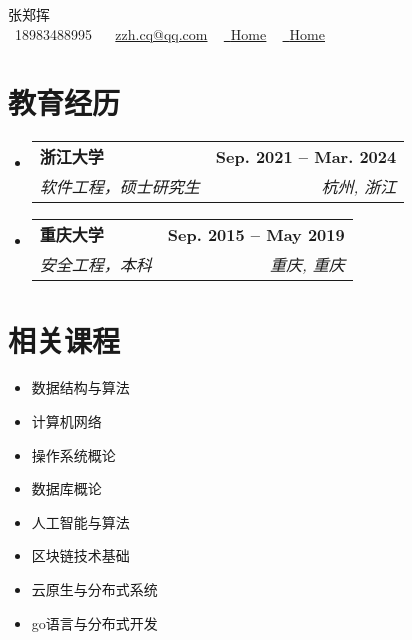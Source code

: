 \documentclass[letterpaper,11pt]{ctexart}
\makeatletter
\newcommand{\resumeSubheading}[4]{
  \vspace{-2pt}\item
    \begin{tabular*}{1.0\textwidth}[t]{l@{\extracolsep{\fill}}r}
      \textbf{#1} & \textbf{\small #2} \\
      \textit{\small#3} & \textit{\small #4} \\
    \end{tabular*}\vspace{-7pt}
}
\newcommand{\resumeSubHeadingListStart}{\begin{itemize}[leftmargin=0.0in, label={}]}
\newcommand{\resumeSubHeadingListEnd}{\end{itemize}}
\makeatother
\begin{document}

\begin{center}
    {\Huge \scshape 张郑挥} \\ \vspace{1pt}
    \vspace{1pt}
    \small \raisebox{-0.1\height}\faPhone\ 18983488995 ~ \raisebox{-0.2\height}\faEnvelope\  \underline{zzh.cq@qq.com} ~
    \href{https://linkedin.com/in/kevin-zhang-95245521b/}{\raisebox{-0.2\height}\faLinkedin\ \underline{Home}}  ~
    \href{https://github.com/kevin-zhangzh}{\raisebox{-0.2\height}\faGithub\ \underline{Home}}
    \vspace{-8pt}
\end{center}


\section{教育经历}
  \resumeSubHeadingListStart
    \resumeSubheading
      {浙江大学}{Sep. 2021 -- Mar. 2024}
      {软件工程，硕士研究生}{杭州, 浙江}
    \resumeSubheading
      {重庆大学}{Sep. 2015 -- May 2019}
      {安全工程，本科}{重庆, 重庆}
  \resumeSubHeadingListEnd

\section{相关课程}
       \begin{multicols}{4}
           \begin{itemize}[itemsep=-5pt, parsep=3pt]
               \item 数据结构与算法
               \item 计算机网络
               \item 操作系统概论
               \item 数据库概论
               \item 人工智能与算法
               \item 区块链技术基础
               \item 云原生与分布式系统
               \item go语言与分布式开发
           \end{itemize}
       \end{multicols}
       \vspace*{2.0\multicolsep}
\end{document}
